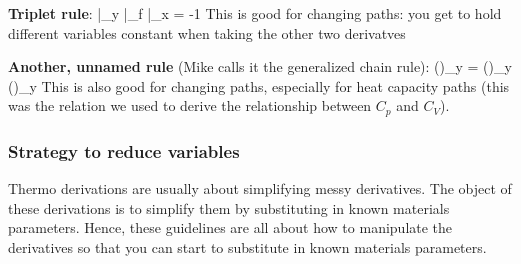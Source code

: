 \documentclass[12pt]{article}
\begin{document}
\textbf{Triplet rule}:
\eqs
{}|_y |_f |_x = -1
\eqe
This is good for changing paths: you get to hold different variables constant when taking the other two derivatves

\textbf{Another, unnamed rule} (Mike calls it the generalized chain rule):
\eqs
\label{genChainRule}
\left(\right)_y = \left(\right)_y \left(\right)_y
\eqe
This is also good for changing paths, especially for heat capacity paths (this was the relation we used to derive the relationship between $C_p$ and $C_V$).
\subsubsection{Strategy to reduce variables}
Thermo derivations are usually about simplifying messy derivatives. The object of these derivations is to simplify them by substituting in known materials parameters. Hence, these guidelines are all about how to manipulate the derivatives so that you can start to substitute in known materials parameters.
\end{document}

